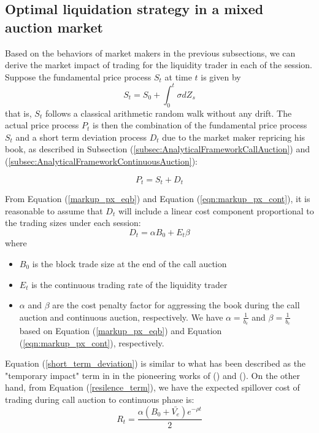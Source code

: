 \documentclass{article}
\begin{document}
\subsection{Optimal liquidation strategy in a mixed auction market}

Based on the behaviors of market makers in the previous subsections, we can derive the market impact of trading for the liquidity trader in each of the session. Suppose the fundamental price process $S_t$ at time $t$ is given by
\[
  S_t = S_0 + \int_0^t \sigma dZ_s
\]
that is, $S_t$ follows a classical arithmetic random walk without any drift. The actual price process $P_t$ is then the combination of the fundamental price process $S_t$ and a short term deviation process $D_t$ due to the market maker repricing his book, as described in Subsection (\ref{subsec:AnalyticalFrameworkCallAuction}) and (\ref{subsec:AnalyticalFrameworkContinuousAuction}):

\[
  P_t = S_t + D_t
\]

From Equation (\ref{markup_px_eqb}) and Equation (\ref{eqn:markup_px_cont}), it is reasonable to assume that $D_t$ will include a linear cost component proportional to the trading sizes under each session:
\begin{equation}\label{short_term_deviation}
  D_t = \alpha B_0 + E_t \beta
\end{equation}
where
\begin{itemize}
  \item $B_0$ is the block trade size at the end of the call auction
  \item $E_t$ is the continuous trading rate of the liquidity trader
  \item $\alpha$ and $\beta$ are the cost penalty factor for aggressing the book during the call auction and continuous auction, respectively. We have $\alpha=\frac{1}{b_e}$ and $\beta=\frac{1}{b_c}$ based on Equation (\ref{markup_px_eqb}) and Equation (\ref{eqn:markup_px_cont}), respectively.
\end{itemize}
Equation (\ref{short_term_deviation}) is similar to what has been described as the "temporary impact" term in in the pioneering works of (\cite{BertimasLo1999}) and (\cite{AlmgrenChriss2000}). On the other hand, from Equation (\ref{resilence_term}), we have the expected spillover cost of trading during call auction to continuous phase is:
\[
  R_t = \frac{\alpha (B_0 + \bar{V_e}) e^{-\rho t}}{2}
\]
\end{document}
